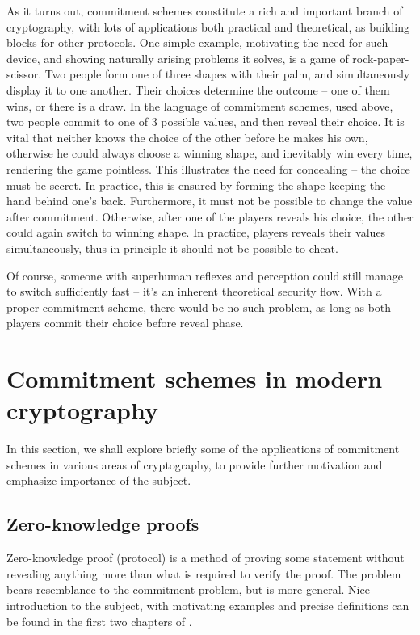 \documentclass[10pt]{article}
\begin{document}
As it turns out, commitment schemes constitute a rich and important branch of cryptography, with lots of
applications both practical and theoretical, as building blocks for other protocols. One simple example,
motivating the need for such device, and showing naturally arising problems it solves, is a game of 
rock-paper-scissor. Two people form one of three shapes with their palm, and simultaneously display it
to one another. Their choices determine the outcome -- one of them wins, or there is a draw. In the
language of commitment schemes, used above, two people commit to one of 3 possible values, and then reveal
their choice. It is vital that neither knows the choice of the other before he makes his own, otherwise
he could always choose a winning shape, and inevitably win every time, rendering the game pointless.
This illustrates the need for concealing -- the choice must be secret. In practice, this is ensured
by forming the shape keeping the hand behind one's back. Furthermore, it must not be possible to change
the value after commitment. Otherwise, after one of the players reveals his choice, the other could again
switch to winning shape. In practice, players reveals their values simultaneously, thus in principle it
should not be possible to cheat.

Of course, someone with superhuman reflexes and perception could still manage to switch sufficiently 
fast -- it's an inherent theoretical security flow. With a proper commitment scheme, there would be no
such problem, as long as both players commit their choice before reveal phase.


\section{Commitment schemes in modern cryptography}

In this section, we shall explore briefly some of the applications of commitment schemes in various
areas of cryptography, to provide further motivation and emphasize importance of the subject.

\subsection{Zero-knowledge proofs}

Zero-knowledge proof (protocol) is a method of proving some statement without revealing anything more
than what is required to verify the proof. The problem bears resemblance to the commitment problem, but
is more general. Nice introduction to the subject, with motivating examples and precise definitions can
be found in the first two chapters of \cite{MIT:StatZero}. 
\end{document}
